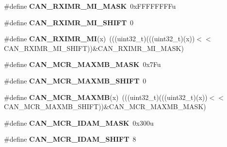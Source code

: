 \begin{DoxyCompactItemize}
\item 
\#define {\bfseries C\+A\+N\+\_\+\+R\+X\+I\+M\+R\+\_\+\+M\+I\+\_\+\+M\+A\+SK}~0x\+F\+F\+F\+F\+F\+F\+F\+Fu\hypertarget{group__CAN__Register__Masks_ga3cef91282e43c8e5d2c30e65d375f964}{}\label{group__CAN__Register__Masks_ga3cef91282e43c8e5d2c30e65d375f964}

\item 
\#define {\bfseries C\+A\+N\+\_\+\+R\+X\+I\+M\+R\+\_\+\+M\+I\+\_\+\+S\+H\+I\+FT}~0\hypertarget{group__CAN__Register__Masks_gae3dd7acc84e521ca0a05beb33f7b434c}{}\label{group__CAN__Register__Masks_gae3dd7acc84e521ca0a05beb33f7b434c}

\item 
\#define {\bfseries C\+A\+N\+\_\+\+R\+X\+I\+M\+R\+\_\+\+MI}(x)~(((uint32\+\_\+t)(((uint32\+\_\+t)(x))$<$$<$C\+A\+N\+\_\+\+R\+X\+I\+M\+R\+\_\+\+M\+I\+\_\+\+S\+H\+I\+FT))\&C\+A\+N\+\_\+\+R\+X\+I\+M\+R\+\_\+\+M\+I\+\_\+\+M\+A\+SK)\hypertarget{group__CAN__Register__Masks_gae80c7ae8e847975c034fb39476b6a840}{}\label{group__CAN__Register__Masks_gae80c7ae8e847975c034fb39476b6a840}

\item 
\#define {\bfseries C\+A\+N\+\_\+\+M\+C\+R\+\_\+\+M\+A\+X\+M\+B\+\_\+\+M\+A\+SK}~0x7\+Fu\hypertarget{group__CAN__Register__Masks_ga86b59c74c0b9f310c3922c7c8c04dd03}{}\label{group__CAN__Register__Masks_ga86b59c74c0b9f310c3922c7c8c04dd03}

\item 
\#define {\bfseries C\+A\+N\+\_\+\+M\+C\+R\+\_\+\+M\+A\+X\+M\+B\+\_\+\+S\+H\+I\+FT}~0\hypertarget{group__CAN__Register__Masks_ga0807275385d5041baeca3bb7ddb4bdf5}{}\label{group__CAN__Register__Masks_ga0807275385d5041baeca3bb7ddb4bdf5}

\item 
\#define {\bfseries C\+A\+N\+\_\+\+M\+C\+R\+\_\+\+M\+A\+X\+MB}(x)~(((uint32\+\_\+t)(((uint32\+\_\+t)(x))$<$$<$C\+A\+N\+\_\+\+M\+C\+R\+\_\+\+M\+A\+X\+M\+B\+\_\+\+S\+H\+I\+FT))\&C\+A\+N\+\_\+\+M\+C\+R\+\_\+\+M\+A\+X\+M\+B\+\_\+\+M\+A\+SK)\hypertarget{group__CAN__Register__Masks_ga3b4797e2f712a545396f339653929457}{}\label{group__CAN__Register__Masks_ga3b4797e2f712a545396f339653929457}

\item 
\#define {\bfseries C\+A\+N\+\_\+\+M\+C\+R\+\_\+\+I\+D\+A\+M\+\_\+\+M\+A\+SK}~0x300u\hypertarget{group__CAN__Register__Masks_ga758ccb033a3d823109f8bf4e23b46827}{}\label{group__CAN__Register__Masks_ga758ccb033a3d823109f8bf4e23b46827}

\item 
\#define {\bfseries C\+A\+N\+\_\+\+M\+C\+R\+\_\+\+I\+D\+A\+M\+\_\+\+S\+H\+I\+FT}~8\hypertarget{group__CAN__Register__Masks_gae76a75d680b0c33f41429f14132ee78f}{}\label{group__CAN__Register__Masks_gae76a75d680b0c33f41429f14132ee78f}


\end{DoxyCompactItemize}
